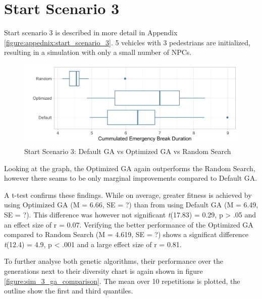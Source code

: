 \section{Start Scenario 3}
\label{chap:evaluation:scenario_3}
Start scenario 3 is described in more detail in Appendix \ref{figure:appednix:start_scenario_3}. 5 vehicles with 3 pedestrians are initialized, resulting in a simulation with only a small number of NPCs.

\begin{figure}[ht] 
	\label{figure:sim_3_comparison}
	\includegraphics[width=1\linewidth]{simulations/evaluation/plots/sim_3_comparison}
	\caption{Start Scenario 3: Default GA vs Optimized GA vs Random Search}
\end{figure}

Looking at the graph, the Optimized GA again outperforms the Random Search, however there seams to be only marginal improvements compared to Default GA. 

A t-test confirms these findings. While on average, greater fitness is achieved by using Optimized GA (M = 6.66, SE = ?) than from using Default GA (M = 6.49, SE = ?). This difference was however not significant \textit{t}(17.83) = 0.29, p > .05 and an effect size of r = 0.07.
Verifying the better performance of the Optimized GA compared to Random Search (M = 4.619, SE = ?) shows a significat difference \textit{t}(12.4) = 4.9, p < .001 and a large effect size of r = 0.81.

To further analyse both genetic algorithms, their performance over the generations next to their diversity chart is again shown in figure \ref{figure:sim_3_ga_comparison}. The mean over 10 repetitions is plotted, the outline show the first and third quantiles.

